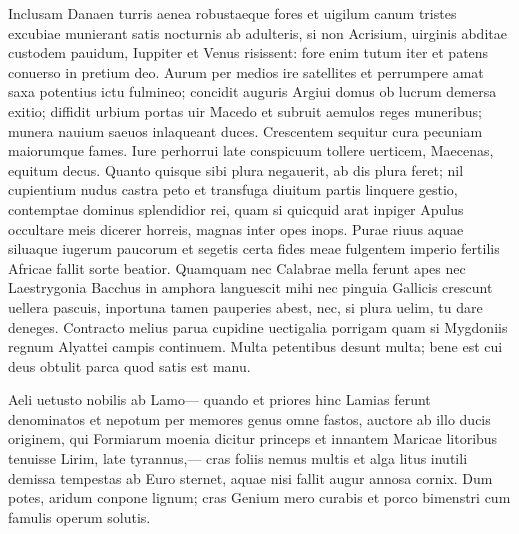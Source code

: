 \documentclass{book}
\newenvironment {carmen} [1] [\relax] 
  {\Titulus \Versus \incipit*\numerus{1}#1}
  {\endVersus}
\newcommand {\Alcaic}    {\Forma \strophae {0 \poena 01 \poena 2}}
\newcommand {\AsclA}     {\Forma \strophae {0 \poena 00 \poena 2}}
\begin{document}
\begin{carmen}[\AsclA]


Inclusam Danaen turris aenea
 robustaeque fores et uigilum canum
 tristes excubiae munierant satis
      nocturnis ab adulteris, 
si non Acrisium, uirginis abditae               
 custodem pauidum, Iuppiter et Venus
 risissent: fore enim tutum iter et patens
      conuerso in pretium deo. 
Aurum per medios ire satellites
 et perrumpere amat saxa potentius               
 ictu fulmineo; concidit auguris
      Argiui domus ob lucrum 
demersa exitio; diffidit urbium
 portas uir Macedo et subruit aemulos
 reges muneribus; munera nauium     
      saeuos inlaqueant duces. 
Crescentem sequitur cura pecuniam
 maiorumque fames. Iure perhorrui
 late conspicuum tollere uerticem,
      Maecenas, equitum decus.                
Quanto quisque sibi plura negauerit,
 ab dis plura feret; nil cupientium
 nudus castra peto et transfuga diuitum
      partis linquere gestio, 
contemptae dominus splendidior rei,               
 quam si quicquid arat inpiger Apulus
 occultare meis dicerer horreis,
      magnas inter opes inops. 
Purae riuus aquae siluaque iugerum
 paucorum et segetis certa fides meae               
 fulgentem imperio fertilis Africae
      fallit sorte beatior. 
Quamquam nec Calabrae mella ferunt apes
 nec Laestrygonia Bacchus in amphora
 languescit mihi nec pinguia Gallicis               
      crescunt uellera pascuis, 
inportuna tamen pauperies abest,
 nec, si plura uelim, tu dare deneges.
 Contracto melius parua cupidine
      uectigalia porrigam                
quam si Mygdoniis regnum Alyattei
 campis continuem. Multa petentibus
 desunt multa; bene est cui deus obtulit
      parca quod satis est manu. 

\end{carmen}

\begin{carmen}[\Alcaic]


Aeli uetusto nobilis ab Lamo---
 quando et priores hinc Lamias ferunt
      denominatos et nepotum
      per memores genus omne fastos, 
auctore ab illo ducis originem,               
 qui Formiarum moenia dicitur
      princeps et innantem Maricae
      litoribus tenuisse Lirim, 
late tyrannus,--- cras foliis nemus
 multis et alga litus inutili               
      demissa tempestas ab Euro
      sternet, aquae nisi fallit augur 
annosa cornix. Dum potes, aridum
 conpone lignum; cras Genium mero
      curabis et porco bimenstri               
      cum famulis operum solutis. 

\end{carmen}
\end{document}
